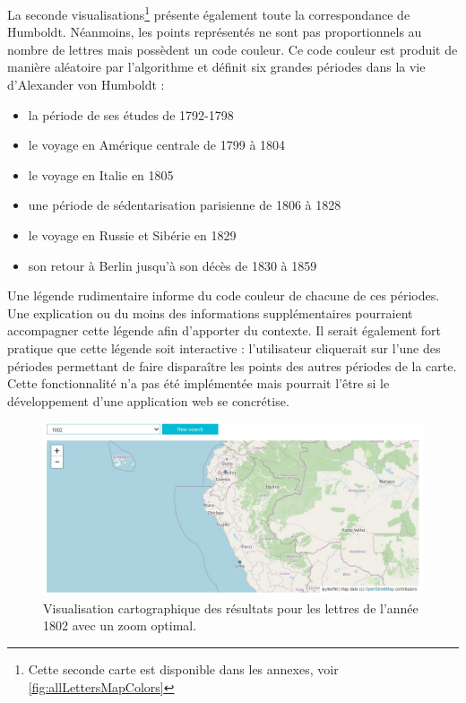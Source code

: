 \documentclass[a4paper, 12pt, twoside]{book}
\begin{document}
La seconde visualisations\footnote{Cette seconde carte est disponible dans les annexes, voir \autoref{fig:allLettersMapColors}} présente également toute la correspondance de Humboldt. Néanmoins, les points représentés ne sont pas proportionnels au nombre de lettres mais possèdent un code couleur. Ce code couleur est produit de manière aléatoire par l'algorithme et définit six grandes périodes dans la vie d'Alexander von Humboldt :
\begin{itemize}
    \item la période de ses études de 1792-1798
    \item le voyage en Amérique centrale de 1799 à 1804
    \item le voyage en Italie en 1805
    \item une période de sédentarisation parisienne de 1806 à 1828
    \item le voyage en Russie et Sibérie en 1829
    \item son retour à Berlin jusqu'à son décès de 1830 à 1859
\end{itemize}
Une légende rudimentaire informe du code couleur de chacune de ces périodes. Une explication ou du moins des informations supplémentaires pourraient accompagner cette légende afin d'apporter du contexte. Il serait également fort pratique que cette légende soit interactive : l'utilisateur cliquerait sur l'une des périodes permettant de faire disparaître les points des autres périodes de la carte. Cette fonctionnalité n'a pas été implémentée mais pourrait l'être si le développement d'une application web se concrétise. 

\begin{figure}[ht!]
\vspace{-15pt}
    \centering
         \includegraphics[scale=0.55]{img/mapviz_date_1802.jpg}
         \caption{Visualisation cartographique des résultats pour les lettres de l'année 1802 avec un zoom optimal.}
    \vspace{-15pt}
\end{figure}
\end{document}
